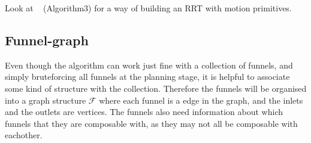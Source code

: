 Look at ~\cite{vonasekGlobalMotionPlanning2013} (Algorithm3) for a way of
building an RRT with motion primitives.

\subsection{Funnel-graph}

Even though the \rrtfunnel{} algorithm can work just fine with a collection of
funnels, and simply bruteforcing all funnels at the planning stage, it is
helpful to associate some kind of structure with the collection. Therefore the
funnels will be organised into a graph structure \(\mathcal{F}\) where each
funnel is a edge in the graph, and the inlets and the outlets are vertices. The
funnels also need information about which funnels that they are composable with,
as they may not all be composable with eachother.


